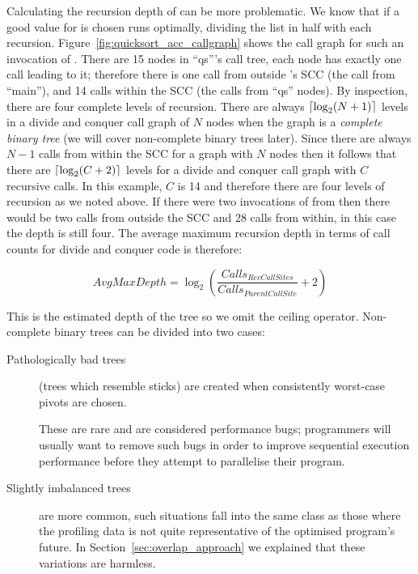 Calculating the recursion depth of \quicksortacc can be more
problematic.
We know that if a good value for  is chosen \quicksortacc runs
optimally,
dividing the list in half with each recursion.
Figure~\ref{fig:quicksort_acc_callgraph} shows the call graph for such an
invocation of \quicksortacc.
There are 15 nodes in ``qs'''s call tree,
each node has exactly one call leading to it;
therefore there is one call from outside \quicksortacc's SCC
(the call from ``main''),
and 14 calls within the SCC
(the calls from ``qs'' nodes).
By inspection, there are four complete levels of recursion.
There are always
$\lceil\log_2(N+1)\rceil$
levels in a divide and conquer call graph of $N$ nodes when
the graph is a \emph{complete binary tree}
(we will cover non-complete binary trees later).
Since there are always $N-1$ calls from within the SCC for a graph with
$N$ nodes then it follows that
there are $\lceil\log_2(C+2)\rceil$ levels for a divide and conquer call graph
with $C$ recursive calls.
In this example, $C$ is 14 and therefore there are four levels of recursion
as we noted above.
If there were two invocations of \quicksortacc from  then there
would be two calls from outside the SCC and 28 calls from within,
in this case the depth is still four.
The average maximum recursion depth in terms of call counts for divide and
conquer code is therefore:

\begin{equation*}
AvgMaxDepth = \log_2
	\left(\frac{Calls_{RecCallSites}}{Calls_{ParentCallSite}} + 2\right)
\end{equation*}

\noindent
This is the estimated depth of the tree so we omit the ceiling operator.
Non-complete binary trees can be divided into two cases:

\begin{description}
    \item[Pathologically bad trees] (trees which resemble sticks)
    are created when consistently worst-case pivots are chosen.

    These are rare and are considered performance bugs;
    programmers will usually want to remove such bugs in order to improve
    sequential execution performance before they attempt to parallelise
    their program.

    \item[Slightly imbalanced trees] are more common,
    such situations fall into the same class as those where the profiling
    data is not quite representative of the optimised program's future.
    In Section~\ref{sec:overlap_approach} we explained that these variations
    are harmless.
\end{description}

